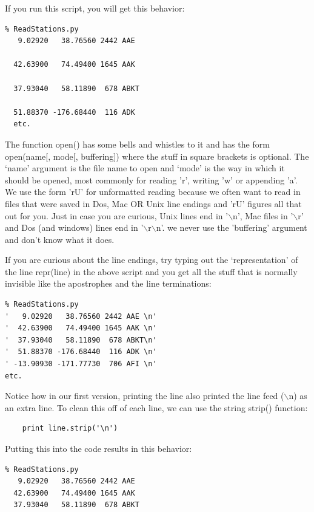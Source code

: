 \documentclass[11pt]{book}
\begin{document}
{{If you run this script, you will get this behavior:
{ \color{blue} \begin{verbatim}
% ReadStations.py
   9.02920   38.76560 2442 AAE

  42.63900   74.49400 1645 AAK

  37.93040   58.11890  678 ABKT

  51.88370 -176.68440  116 ADK
  etc.
  \end{verbatim}}

\noindent The function  {\color{blue}open()} has some bells and whistles to it and has the form  {\color{blue}open(name[, mode[, buffering])} where the stuff in square brackets is optional.  The `name' argument is the file name to open and `mode' is the way in which it should be opened, most commonly for reading 'r', writing 'w' or appending 'a'. We use the form 'rU' for unformatted reading because we often want to read in files that were saved in Dos, Mac OR Unix line endings and 'rU' figures all that out for you.  Just in case you are curious, Unix lines end in '$\backslash$n',  Mac files in '$\backslash$r' and Dos (and windows) lines end in '$\backslash$r$\backslash$n'.    we never use the 'buffering' argument and don't know what it does.

If you are curious about the line endings, try typing out the `representation' of the line {\color{blue}repr(line)} in the above script and you get all the  stuff that is normally  invisible like the apostrophes and the line terminations:

{ \color{blue} \begin{verbatim}
% ReadStations.py
'   9.02920   38.76560 2442 AAE \n'
'  42.63900   74.49400 1645 AAK \n'
'  37.93040   58.11890  678 ABKT\n'
'  51.88370 -176.68440  116 ADK \n'
' -13.90930 -171.77730  706 AFI \n'
etc.
\end{verbatim}}


\noindent Notice how in our first version, printing the line also printed the line feed ($\backslash$n) as an extra line.  To clean this off of each line, we can use the  string {\color{blue}strip()} function:

{ \color{blue} \begin{verbatim}
    print line.strip('\n')
\end{verbatim}}

\noindent Putting this into the code results in this behavior:

{ \color{blue} \begin{verbatim}
% ReadStations.py
   9.02920   38.76560 2442 AAE
  42.63900   74.49400 1645 AAK
  37.93040   58.11890  678 ABKT
\end{verbatim}}


}}
\end{document}
